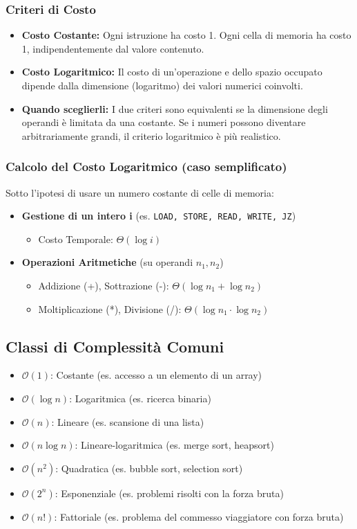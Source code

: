\subsubsection*{Criteri di Costo}
\begin{itemize}
    \item \textbf{Costo Costante:} Ogni istruzione ha costo 1. Ogni cella di memoria ha costo 1, indipendentemente dal valore contenuto.
    \item \textbf{Costo Logaritmico:} Il costo di un'operazione e dello spazio occupato dipende dalla dimensione (logaritmo) dei valori numerici coinvolti.
    \item \textbf{Quando sceglierli:} I due criteri sono equivalenti se la dimensione degli operandi è limitata da una costante. Se i numeri possono diventare arbitrariamente grandi, il criterio logaritmico è più realistico.
\end{itemize}

\subsubsection*{Calcolo del Costo Logaritmico (caso semplificato)}
Sotto l'ipotesi di usare un numero costante di celle di memoria:
\begin{itemize}
    \item \textbf{Gestione di un intero i} (es. \texttt{LOAD, STORE, READ, WRITE, JZ})
    \begin{itemize}
        \item Costo Temporale: $\Theta(\log i)$
    \end{itemize}
    \item \textbf{Operazioni Aritmetiche} (su operandi $n_1, n_2$)
    \begin{itemize}
        \item Addizione (+), Sottrazione (-): $\Theta(\log n_1 + \log n_2)$
        \item Moltiplicazione (*), Divisione (/): $\Theta(\log n_1 \cdot \log n_2)$
    \end{itemize}
\end{itemize}

\subsection*{Classi di Complessità Comuni}
\begin{itemize}
    \item $\mathcal{O}(1)$: Costante (es. accesso a un elemento di un array)
    \item $\mathcal{O}(\log n)$: Logaritmica (es. ricerca binaria)
    \item $\mathcal{O}(n)$: Lineare (es. scansione di una lista)
    \item $\mathcal{O}(n \log n)$: Lineare-logaritmica (es. merge sort, heapsort)
    \item $\mathcal{O}(n^2)$: Quadratica (es. bubble sort, selection sort)
    \item $\mathcal{O}(2^n)$: Esponenziale (es. problemi risolti con la forza bruta)
    \item $\mathcal{O}(n!)$: Fattoriale (es. problema del commesso viaggiatore con forza bruta)
\end{itemize}